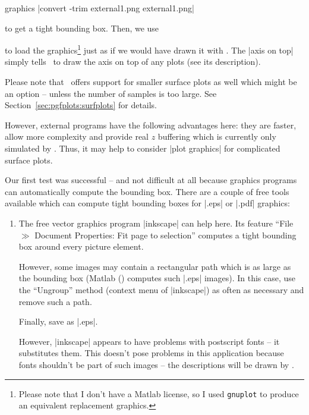 {{\begin{addplotoperation}[]{graphics}{}
	|convert -trim external1.png external1.png|

	to get a tight bounding box. Then, we use

\begin{codeexample}[]
\end{codeexample}
\noindent to load the graphics\footnote{Please note that I don't have a Matlab license, so I used \texttt{gnuplot} to produce an equivalent replacement graphics.} just as if we would have drawn it with \PGFPlots. The |axis on top| simply tells \PGFPlots\ to draw the axis on top of any plots (see its description).

Please note that \PGFPlots\ offers support for smaller surface plots as well which might be an option -- unless the number of samples is too large. See Section~\ref{sec:pgfplots:surfplots} for details.

\noindent However, external programs have the following advantages here: they are faster, allow more complexity and provide real $z$ buffering which is currently only simulated by \PGFPlots. Thus, it may help to consider |plot graphics| for complicated surface plots.

Our first test was successful -- and not difficult at all because graphics programs can automatically compute the bounding box. There are a couple of free tools available which can compute tight bounding boxes for |.eps| or |.pdf| graphics:
\begin{enumerate}
	\item The free vector graphics program |inkscape| can help here. Its feature ``File $\gg$ Document Properties: Fit page to selection'' computes a tight bounding box around every picture element. 

	However, some images may contain a rectangular path which is as large as the bounding box (Matlab (\textregistered) computes such |.eps| images). In this case, use the ``Ungroup'' method (context menu of |inkscape|) as often as necessary and remove such a path.

	Finally, save as |.eps|.

	However, |inkscape| appears to have problems with postscript fonts -- it substitutes them. This doesn't pose problems in this application because fonts shouldn't be part of such images -- the descriptions will be drawn by \PGFPlots.


\end{enumerate}
\end{addplotoperation}}}
